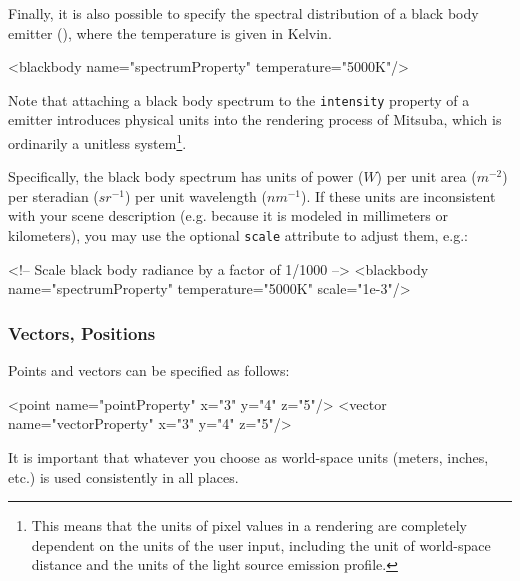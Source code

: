 \label{sec:blackbody}
Finally, it is also possible to specify the spectral distribution of a black body emitter (),
where the temperature is given in Kelvin.
\begin{xml}
<blackbody name="spectrumProperty" temperature="5000K"/>
\end{xml}
Note that attaching a black body spectrum to the \texttt{intensity} property
of a emitter introduces physical units into the rendering process of
Mitsuba, which is ordinarily a unitless system\footnote{This means that the
units of pixel values in a rendering are completely dependent on the units of
the user input, including the unit of world-space distance and the units of
the light source emission profile.}.

Specifically, the black body spectrum has units of power ($W$) per
unit area ($m^{-2}$) per steradian ($sr^{-1}$) per unit wavelength ($nm^{-1}$).
If these units are inconsistent with your scene description (e.g. because it is modeled in millimeters or kilometers), you may use the
optional \texttt{scale} attribute to adjust them, e.g.:
\begin{xml}
<!-- Scale black body radiance by a factor of 1/1000 -->
<blackbody name="spectrumProperty" temperature="5000K" scale="1e-3"/>
\end{xml}

\subsubsection{Vectors, Positions}
Points and vectors can be specified as follows:
\begin{xml}
<point name="pointProperty" x="3" y="4" z="5"/>
<vector name="vectorProperty" x="3" y="4" z="5"/>
\end{xml}
It is important that whatever you choose as world-space units (meters, inches, etc.) is
used consistently in all places.
